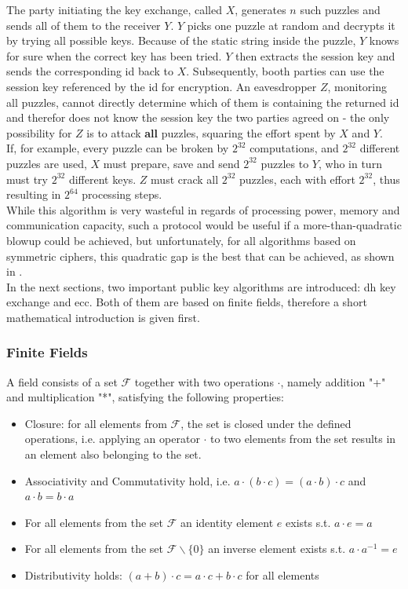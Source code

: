The party initiating the key exchange, called $X$, generates $n$ such puzzles and sends all of them to the receiver $Y$. $Y$ picks one puzzle at random and
decrypts it by trying all possible keys. Because of the static string inside the puzzle, $Y$ knows for sure when the correct key has been tried.
$Y$ then extracts the session key and sends the corresponding id back to $X$. Subsequently, booth parties can use the session key referenced by the id for encryption.
An eavesdropper $Z$, monitoring all puzzles, cannot directly determine which of them is containing the returned id and therefor does not know the session key the 
two parties agreed on - the only possibility for $Z$ is to attack \textbf{all} puzzles, squaring the effort spent by $X$ and $Y$.
\\

If, for example, every puzzle can be broken by $2^{32}$ computations, and $2^{32}$ different puzzles are used, $X$ must prepare, save and send $2^{32}$ puzzles
to $Y$, who in turn must try $2^{32}$ different keys. $Z$ must crack all $2^{32}$ puzzles, each with effort $2^{32}$, thus resulting in $2^{64}$ processing steps.
\\

While this algorithm is very wasteful in regards of processing power, memory and communication capacity, such a protocol would be useful if a more-than-quadratic
blowup could be achieved, but unfortunately, for all algorithms based on symmetric ciphers, this quadratic gap is the best that can be achieved,
as shown in \cite{Barak09merklepuzzles}. 
\\
  
In the next sections, two important public key algorithms are introduced: \gls{dh} key exchange and \gls{ecc}. Both of them are based on finite fields,
therefore a short mathematical introduction is given first.

\subsubsection{Finite Fields}\label{finiteFields}

A field consists of a set $\mathcal{F}$ together with two operations $\cdot$, namely addition "+" and multiplication "*", satisfying the following properties:

\begin{itemize}
 \item  Closure: for all elements from $\mathcal{F}$, the set is closed under the defined operations, i.e. applying an operator $\cdot$ to two elements from the set results in an
element also belonging to the set.
 \item Associativity and Commutativity hold, i.e. $a \cdot (b \cdot c) = (a \cdot b) \cdot c$ and $a \cdot b = b \cdot a$
 \item For all elements from the set $\mathcal{F}$ an identity element $e$ exists s.t. $a\cdot e = a$
 \item For all elements from the set $\mathcal{F} \backslash \{0\}$ an inverse element exists s.t. $a\cdot a^{-1} = e$
 \item Distributivity holds: $(a+b) \cdot c = a \cdot c + b \cdot c$ for all elements 
\end{itemize}

